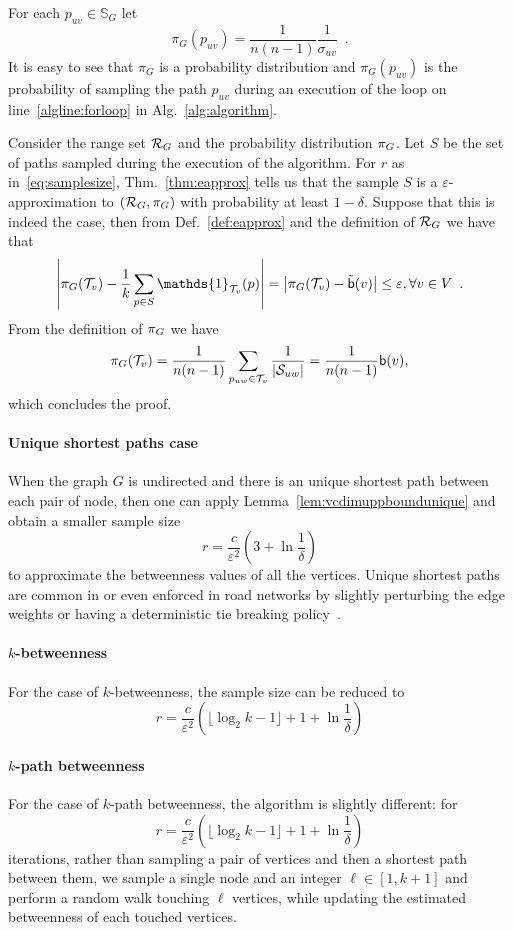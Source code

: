 \begin{IEEEproof}
  For each $p_{uv}\in\mathbb{S}_G$ let
  \[
  \pi_G(p_{uv})=\frac{1}{n(n-1)}\frac{1}{\sigma_{uv}}\enspace.
  \]
  It is easy to see that $\pi_G$ is a probability distribution and
  $\pi_G(p_{uv})$ is the probability of sampling the path $p_{uv}$ during an
  execution of the loop on line~\ref{algline:forloop} in
  Alg.~\ref{alg:algorithm}.
  
  Consider the range set $\mathcal{R}_G$ and the probability distribution $\pi_G$.
  Let $S$ be the set of paths sampled during the execution of the algorithm.
  For $r$ as in~\eqref{eq:samplesize}, Thm.~\ref{thm:eapprox} tells us that the sample $S$ is a
  $\varepsilon$-approximation to $(\mathcal{R}_G,\pi_G)$ with probability at least
  $1-\delta$. Suppose that this is indeed the case, then from
  Def.~\ref{def:eapprox} and the definition of $\mathcal{R}_G$ we have that
  \[
  \left|\prob_G(\mathcal{T}_v) - \frac{1}{k}\sum_{p\in
  S}\mathds{1}_{\mathcal{T}_v}(p)\right|=\left|\prob_G(\mathcal{T}_v) -
  \tilde\betw(v)\right|\le\varepsilon, \forall v\in
  V\enspace.
  \]
  From the definition of $\pi_G$ we have
  \[
  \pi_G(\mathcal{T}_v)=\frac{1}{n(n-1)}\sum_{p_{uw}\in\mathcal{T}_v}\frac{1}{|\mathcal{S}_{uw}|}=\frac{1}{n(n-1)}\mathsf{b}(v),
  \]
  which concludes the proof.
\end{IEEEproof}

\paragraph{Unique shortest paths case} When the graph $G$ is undirected and
there is an unique shortest path between each pair of node, then one can apply
Lemma~\ref{lem:vcdimuppboundunique} and obtain a smaller sample size
\[
  r= \frac{c}{\varepsilon^2}\left(3+\ln\frac{1}{\delta}\right)
\]
to approximate the betweenness values of all the vertices. Unique shortest
paths are common in or even enforced in road networks by
slightly perturbing the edge weights or having a deterministic tie breaking
policy~\citep{GeisbergerSS08}.

\paragraph{$k$-betweenness} For the case of $k$-betweenness, the sample size can
be reduced to 
\[ 
  r= \frac{c}{\varepsilon^2}\left(\lfloor\log_2 k-1\rfloor + 1 +\ln\frac{1}{\delta}\right)
\]

\paragraph{$k$-path betweenness}
For the case of $k$-path betweenness, the algorithm is slightly different:
for 
\[
  r= \frac{c}{\varepsilon^2}\left(\lfloor\log_2 k-1\rfloor + 1 +\ln\frac{1}{\delta}\right)
\]
iterations, rather than sampling a pair of vertices and then a shortest path
between them, we sample a single node and an integer $\ell\in[1,k+1]$ and
perform a random walk touching $\ell$ vertices, while updating the estimated
betweenness of each touched vertices.

